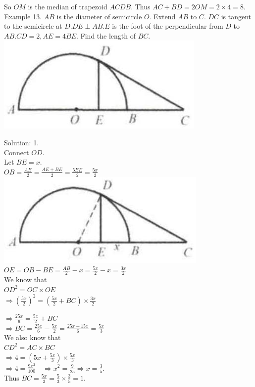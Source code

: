 \documentclass[10pt]{article}
\begin{document}
So \(O M\) is the median of trapezoid \(A C D B\). Thus \(A C+B D=2 O M=2 \times 4=8\).\\
Example 13. \(A B\) is the diameter of semicircle \(O\). Extend \(A B\) to \(C\). \(D C\) is tangent to the semicircle at \(D . D E \perp A B . E\) is the foot of the perpendicular from \(D\) to \(A B . C D=2, A E=4 B E\). Find the length of \(B C\).\\
\includegraphics[max width=\textwidth, center]{2025_04_17_97bc1f7e44d93c271a88g-152}

Solution: 1.\\
Connect \(O D\).\\
Let \(B E=x\).\\
\(O B=\frac{A B}{2}=\frac{A E+B E}{2}=\frac{5 B E}{2}=\frac{5 x}{2}\)\\
\includegraphics[max width=\textwidth, center]{2025_04_17_97bc1f7e44d93c271a88g-152(1)}\\
\(O E=O B-B E=\frac{A B}{2}-x=\frac{5 x}{2}-x=\frac{3 x}{2}\)\\
We know that\\
\(O D^{2}=O C \times O E\)\\
\(\Rightarrow\left(\frac{5 x}{2}\right)^{2}=\left(\frac{5 x}{2}+B C\right) \times \frac{3 x}{2}\)


\(\Rightarrow \frac{25 x}{6}=\frac{5 x}{2}+B C\)\\
\(\Rightarrow B C=\frac{25 x}{6}-\frac{5 x}{2}=\frac{25 x-15 x}{6}=\frac{5 x}{3}\)\\
We also know that\\
\(C D^{2}=A C \times B C\)\\
\(\Rightarrow 4=\left(5 x+\frac{5 x}{3}\right) \times \frac{5 x}{3}\)\\
\(\Rightarrow 4=\frac{9 x^{2}}{100} \quad \Rightarrow x^{2}=\frac{9}{25} \Rightarrow x=\frac{3}{5}\).\\
Thus \(B C=\frac{5 x}{3}=\frac{5}{3} \times \frac{3}{5}=1\).
\end{document}
